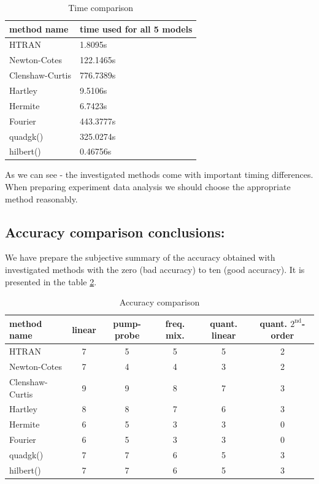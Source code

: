 \documentclass[12pt,twoside,a4paper]{article}
\numberwithin{equation}{subsection}
\numberwithin{figure}{subsection}
\begin{document}
\begin{table}
  \caption{Time comparison} \label{gencom_time} 
  \begin{tabular}{l l}
    method name  &  time used for all 5 models \\
    \hline
    HTRAN & 1.8095s \\
    Newton-Cotes &  122.1465s \\
    Clenshaw-Curtis & 776.7389s \\
    Hartley & 9.5106s \\
    Hermite & 6.7423s \\
    Fourier & 443.3777s \\
    quadgk() & 325.0274s \\
    hilbert() & 0.46756s \\
    \hline
  \end{tabular}
\end{table} 

As we can see - the investigated methods come with important timing differences. When preparing experiment data analysis we should
choose the appropriate method reasonably.

\subsection{Accuracy comparison conclusions:} \label{chap:gencom_accuracy}

We have prepare the subjective summary of the accuracy obtained with investigated methods with the zero (bad accuracy) to ten
(good accuracy). It is presented in the table \ref{gencom_accuracy}.


\begin{table}
  \caption{Accuracy comparison} \label{gencom_accuracy} 
  \begin{tabular}{l | c | c | c | c | c}
    method name  &  linear  &  pump-probe  &  freq. mix.  &  quant. linear  &  quant. $2^{\text{nd}}$-order \\
    \hline
    HTRAN            &  7  &  5  &  5  &  5  &  2  \\
    Newton-Cotes     &  7  &  4  &  4  &  3  &  2  \\
    Clenshaw-Curtis  &  9  &  9  &  8  &  7  &  3  \\
    Hartley          &  8  &  8  &  7  &  6  &  3  \\
    Hermite          &  6  &  5  &  3  &  3  &  0  \\
    Fourier          &  6  &  5  &  3  &  3  &  0  \\
    quadgk()         &  7  &  7  &  6  &  5  &  3  \\
    hilbert()        &  7  &  7  &  6  &  5  &  3  \\
    \hline
  \end{tabular}
\end{table}
\end{document}
